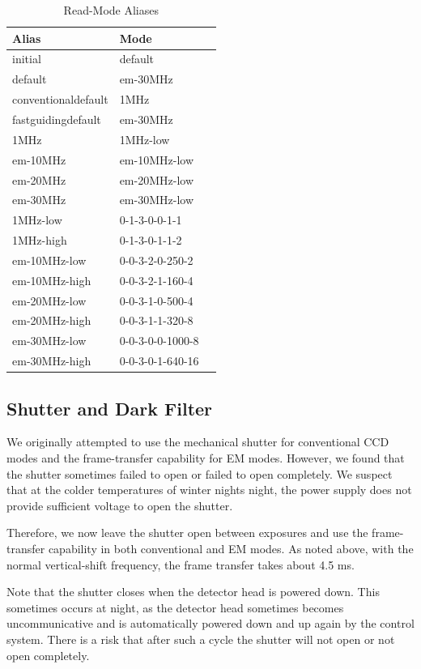 \begin{table}
\caption{Read-Mode Aliases}
\label{table:huitzi-f20-read-mode-aliases}
\begin{center}
\begin{tabular}{lll}
\hline
Alias&Mode\\
\hline
 initial&default\\
 default&em-30MHz\\
 conventionaldefault&1MHz\\
 fastguidingdefault&em-30MHz\\
 1MHz&1MHz-low\\
 em-10MHz&em-10MHz-low\\
 em-20MHz&em-20MHz-low\\
 em-30MHz&em-30MHz-low\\
 1MHz-low&0-1-3-0-0-1-1\\
 1MHz-high&0-1-3-0-1-1-2\\
 em-10MHz-low&0-0-3-2-0-250-2\\
 em-10MHz-high&0-0-3-2-1-160-4\\
 em-20MHz-low&0-0-3-1-0-500-4\\
 em-20MHz-high&0-0-3-1-1-320-8\\
 em-30MHz-low&0-0-3-0-0-1000-8\\
 em-30MHz-high&0-0-3-0-1-640-16\\
 \hline
\end{tabular}
\end{center}
\end{table}

\subsection{Shutter and Dark Filter}

\label{section:huitzi-f20-shutter}

We originally attempted to use the mechanical shutter for conventional CCD modes and the frame-transfer capability for EM modes. However, we found that the shutter sometimes failed to open or failed to open completely. We suspect that at the colder temperatures of winter nights night, the power supply does not provide sufficient voltage to open the shutter.  

Therefore, we now leave the shutter open between exposures and use the frame-transfer capability in both conventional and EM modes. As noted above, with the normal vertical-shift frequency, the frame transfer takes about 4.5 ms.

Note that the shutter closes when the detector head is powered down. This sometimes occurs at night, as the detector head sometimes becomes uncommunicative and is automatically powered down and up again by the control system. There is a risk that after such a cycle the shutter will not open or not open completely.

